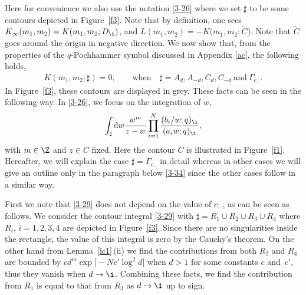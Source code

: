  Here for convenience we also use
 the notation \eqref{3-26} where
 we set $\sharp$ to be some contours
 depicted in
 Figure~\ref{f3}. Note that by definition, one sees
 $K_{\infty}(m_1,m_2)= K(m_1,m_2;D_{\i})$,
 and ${L(m_1,m_2)=-K\big(m_1,m_2;\tilde{C}\big)}$.
 Note that $\tilde{C}$ goes around the origin in negative direction.
 We now show that,
 from the properties of the $q$-Pochhammer symbol discussed in
 Appendix \ref{ac}, the following holds,
\begin{align}
\label{s34-2}
 K(m_1,m_2;\sharp)=0,
 \qquad \text{when}\quad \sharp=A_d,A_{-d},C_d,C_{-d}\ \text{and}\ \Gamma_{c_-}.
\end{align}
 In Figure~\ref{f3}, these contours
 are displayed in grey.
 These facts can be
 seen in the following way.
 In \eqref{3-26}, we focus on the
 integration of $w$,
 \begin{align}
 \label{3-29}
 \int_{\sharp}{\rm d}w\frac{w^{m}}{z-w}
 \prod_{i=1}^N
 \frac{{(b_i/w;q)_{\i}}}{(a_iw;q)_{\i}},
 \end{align}
 with $m\in\Z$ and $z\in C$ fixed. Here the contour $C$ is illustrated in Figure~\ref{f1}.
 Hereafter, we will explain the case $\sharp=\Gamma_{c_-}$ in detail whereas in other cases we will give an outline only in the paragraph below \eqref{3-34} since
 the other cases follow in a similar
 way.

 First we note that \eqref{3-29} does not depend on the value of $c_-$, as can be seen as follows. We consider the contour integral \eqref{3-29}
 with $\sharp=R_1\cup R_2\cup R_3\cup R_4$ where $R_i$, $i=1,2,3,4$ are depicted in
 Figure~\ref{f3}. Since there are no singularities inside the rectangle, the value of this integral is zero by the Cauchy's theorem. On the other hand
 from Lemma~\ref{lc1}\,(ii) we find the contributions from both $R_2$ and $R_4$ are bounded by $cd^m \exp\bigl[-Nc'\log^2 d\bigr]$ when $d>1$ for some constants $c$ and~$c'$, thus they vanish when $d\rightarrow\i$. Combining these facts, we find
 the contribution from $R_1$ is equal to that from $R_3$
 as $d\rightarrow\i$ up to sign.


